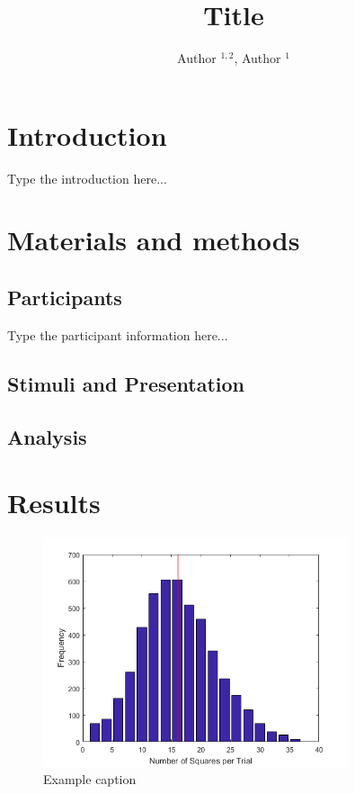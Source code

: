 \documentclass[a4paper,man,floatsintext,12pt]{apa6} %
\title{Title}
\author{Author $^{1,2}$, Author $^1$}
\affiliation{$^1$ Affiliation a, $^2$ Affiliation b}
\begin{document}
\maketitle
\linenumbers %

\justifying %
\setlength{\parindent}{6ex} %

\section{Introduction}

Type the introduction here...

\section{Materials and methods} %

\subsection{Participants}

Type the participant information here...

\subsection{Stimuli and Presentation}
\subsection{Analysis}

\section{Results}


\begin{figure}[h!] %
	\centering	
	\includegraphics[width=0.8\textwidth]{exampleImage.png}
	\caption{Example caption}
	\label{fig:exampleImage}	
\end{figure} 
\end{document}
